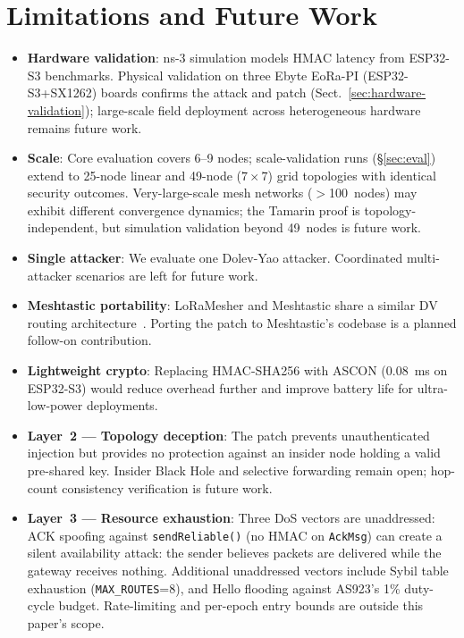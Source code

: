 \documentclass[preprint,12pt]{elsarticle}
\begin{document}
\section{Limitations and Future Work}
\label{sec:limitations}

\begin{itemize}
  \item \textbf{Hardware validation}: ns-3 simulation models HMAC
    latency from ESP32-S3 benchmarks. Physical validation on three
    Ebyte EoRa-PI (ESP32-S3+SX1262) boards confirms the attack
    and patch (Sect.~\ref{sec:hardware-validation}); large-scale
    field deployment across heterogeneous hardware remains future work.

  \item \textbf{Scale}: Core evaluation covers 6–9 nodes;
    scale-validation runs (§\ref{sec:eval}) extend to 25-node linear and
    49-node ($7\times7$) grid topologies with identical security outcomes.
    Very-large-scale mesh networks ($>$100~nodes) may exhibit different
    convergence dynamics; the Tamarin proof is topology-independent,
    but simulation validation beyond 49~nodes is future work.

  \item \textbf{Single attacker}: We evaluate one Dolev-Yao
    attacker. Coordinated multi-attacker scenarios are left for
    future work.

  \item \textbf{Meshtastic portability}: LoRaMesher and Meshtastic
    share a similar DV routing architecture~\cite{sole2024-loramesher-dv}.
    Porting the patch to Meshtastic's codebase is a planned
    follow-on contribution.

  \item \textbf{Lightweight crypto}: Replacing HMAC-SHA256 with
    ASCON (0.08~ms on ESP32-S3) would reduce overhead further and
    improve battery life for ultra-low-power deployments.

  \item \textbf{Layer~2 --- Topology deception}: The patch prevents
    unauthenticated injection but provides no protection against an
    insider node holding a valid pre-shared key.
    Insider Black Hole and selective forwarding remain open;
    hop-count consistency verification is future work.

  \item \textbf{Layer~3 --- Resource exhaustion}: Three DoS vectors
    are unaddressed: ACK spoofing against \texttt{sendReliable()}
    (no HMAC on \texttt{AckMsg}) can create a silent availability attack: the sender believes packets are delivered while the gateway receives nothing.
    Additional unaddressed vectors include Sybil table exhaustion
    (\texttt{MAX\_ROUTES}=8), and Hello flooding against AS923's
    1\% duty-cycle budget.
    Rate-limiting and per-epoch entry bounds are outside this paper's
    scope.

\end{itemize}
\end{document}
